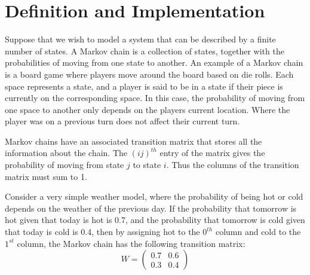 \label{lab:Markov}



\section*{Definition and Implementation}

Suppose that we wish to model a system that can be described by a finite number of states.
A Markov chain is a collection of states, together with the probabilities of moving from one state to another.
An example of a Markov chain is a board game where players move around the board based on die rolls.
Each space represents a state, and a player is said to be in a state if their piece is currently on the corresponding space.
In this case, the probability of moving from one space to another only depends on the players current location.
Where the player was on a previous turn does not affect their current turn.

Markov chains have an associated transition matrix that stores all the information about the chain.
The $(ij)^{th}$ entry of the matrix gives the probability of moving from state $j$ to state $i$.
Thus the columns of the transition matrix must sum to 1.

Consider a very simple weather model, where the probability of being hot or cold depends on the weather of the previous day.
If the probability that tomorrow is hot given that today is hot is 0.7, and the probability that tomorrow is cold given that today is cold is 0.4, then by assigning hot to the $0^{th}$ column and cold to the $1^{st}$ column, the Markov chain has the following transition matrix:
\[ W = \left( \begin{array}{cc}
0.7 & 0.6 \\
0.3 & 0.4 \end{array} \right)\] 

